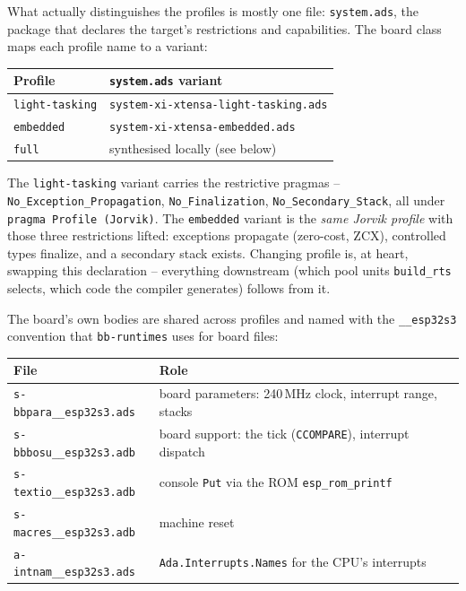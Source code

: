 What actually distinguishes the profiles is mostly one file: \texttt{system.ads},
the package that declares the target's restrictions and capabilities. The board
class maps each profile name to a variant:

\begin{center}
\begin{tabular}{l l}
\toprule
\textbf{Profile} & \textbf{\texttt{system.ads} variant} \\ \midrule
\texttt{light-tasking} & \texttt{system-xi-xtensa-light-tasking.ads} \\
\texttt{embedded}      & \texttt{system-xi-xtensa-embedded.ads} \\
\texttt{full}          & synthesised locally (see below) \\
\bottomrule
\end{tabular}
\end{center}

The \texttt{light-tasking} variant carries the restrictive pragmas --
\texttt{No\_Exception\_Propagation}, \texttt{No\_Finalization},
\texttt{No\_Secondary\_Stack}, all under \texttt{pragma Profile (Jorvik)}. The
\texttt{embedded} variant is the \emph{same Jorvik profile} with those three
restrictions lifted: exceptions propagate (zero-cost, ZCX), controlled types
finalize, and a secondary stack exists. Changing profile is, at heart, swapping
this declaration -- everything downstream (which pool units \texttt{build\_rts}
selects, which code the compiler generates) follows from it.

The board's own bodies are shared across profiles and named with the
\texttt{\_\_esp32s3} convention that \texttt{bb-runtimes} uses for board files:

\begin{center}
\begin{tabular}{l l}
\toprule
\textbf{File} & \textbf{Role} \\ \midrule
\texttt{s-bbpara\_\_esp32s3.ads} & board parameters: 240\,MHz clock, interrupt range, stacks \\
\texttt{s-bbbosu\_\_esp32s3.adb} & board support: the tick (\texttt{CCOMPARE}), interrupt dispatch \\
\texttt{s-textio\_\_esp32s3.adb} & console \texttt{Put} via the ROM \texttt{esp\_rom\_printf} \\
\texttt{s-macres\_\_esp32s3.adb} & machine reset \\
\texttt{a-intnam\_\_esp32s3.ads}  & \texttt{Ada.Interrupts.Names} for the CPU's interrupts \\
\bottomrule
\end{tabular}
\end{center}


